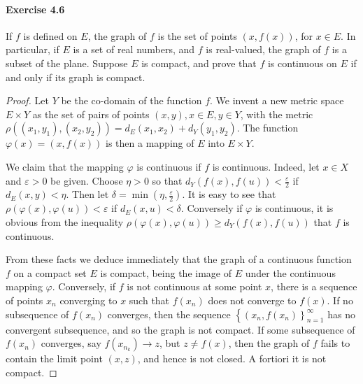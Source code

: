\documentclass{article}
\theoremstyle{definition}
\begin{document}
\paragraph{Exercise 4.6} If $f$ is defined on $E$, the graph of $f$ is the set of points $(x, f(x))$, for $x \in E$. In particular, if $E$ is a set of real numbers, and $f$ is real-valued, the graph of $f$ is a subset of the plane. Suppose $E$ is compact, and prove that $f$ is continuous on $E$ if and only if its graph is compact.
\begin{proof}
    Let $Y$ be the co-domain of the function $f$. We invent a new metric space $E \times Y$ as the set of pairs of points $(x, y), x \in E, y \in Y$, with the metric $\rho\left(\left(x_1, y_1\right),\left(x_2, y_2\right)\right)=d_E\left(x_1, x_2\right)+d_Y\left(y_1, y_2\right)$. The function $\varphi(x)=(x, f(x))$ is then a mapping of $E$ into $E \times Y$.

We claim that the mapping $\varphi$ is continuous if $f$ is continuous. Indeed, let $x \in X$ and $\varepsilon>0$ be given. Choose $\eta>0$ so that $d_Y(f(x), f(u))<\frac{\varepsilon}{2}$ if $d_E(x, y)<\eta$. Then let $\delta=\min \left(\eta, \frac{\varepsilon}{2}\right)$. It is easy to see that $\rho(\varphi(x), \varphi(u))<\varepsilon$ if $d_E(x, u)<\delta$. Conversely if $\varphi$ is continuous, it is obvious from the inequality $\rho(\varphi(x), \varphi(u)) \geq d_Y(f(x), f(u))$ that $f$ is continuous.

From these facts we deduce immediately that the graph of a continuous function $f$ on a compact set $E$ is compact, being the image of $E$ under the continuous mapping $\varphi$. Conversely, if $f$ is not continuous at some point $x$, there is a sequence of points $x_n$ converging to $x$ such that $f\left(x_n\right)$ does not converge to $f(x)$. If no subsequence of $f\left(x_n\right)$ converges, then the sequence $\left\{\left(x_n, f\left(x_n\right)\right\}_{n=1}^{\infty}\right.$ has no convergent subsequence, and so the graph is not compact. If some subsequence of $f\left(x_n\right)$ converges, say $f\left(x_{n_k}\right) \rightarrow z$, but $z \neq f(x)$, then the graph of $f$ fails to contain the limit point $(x, z)$, and hence is not closed. A fortiori it is not compact.
\end{proof}
\end{document}
